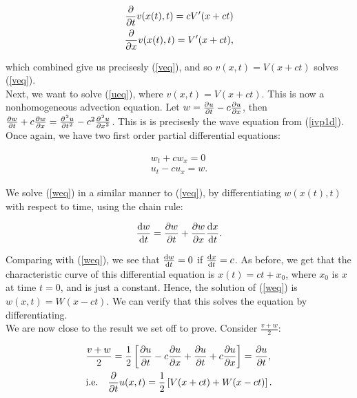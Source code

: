 \documentclass[a4paper, 12pt]{article}
\numberwithin{equation}{section}
\begin{document}
\begin{equation*}
    \begin{aligned}
    \diffp[1]{}{t}v(x(t), t)=cV'(x+ct)\\
    \diffp[1]{}{x}v(x(t), t)=V'(x+ct),
    \end{aligned}
\end{equation*}

which combined give us precisesly (\ref{veq}), and so $v(x,t)=V(x+ct)$ solves (\ref{veq}).
\\

Next, we want to solve (\ref{ueq}), where $v(x,t)=V(x+ct)$. This is now a nonhomogeneous advection equation. Let $w=\diffp[1]{u}{t}-c\diffp{u}{x}$, then 
$\diffp[1]{w}{t}+c\diffp{w}{x}=\diffp[2]{u}{t}-c^2\diffp[2]{u}{x}$. This is is precisesly the wave equation from (\ref{ivp1d}). Once again, we have two first
order partial differential equations:

\begin{align}
    \label{weq}
    w_t+cw_x=0\\
    \label{ueqw}
    u_t-cu_x=w.
\end{align}

We solve (\ref{weq}) in a similar manner to (\ref{veq}), by differentiating $w(x(t),t)$ with respect to time, using the chain rule:

\begin{equation} \label{diffw}
    \diff{w}{t}=\diffp[1]{w}{t}+\diffp[1]{w}{x}\diff{x}{t}. 
\end{equation}

Comparing with (\ref{weq}), we see that $\diff{w}{t}=0$ if $\diff{x}{t}=c$. As before, we get that the characteristic 
curve of this differential equation is $x(t)=ct+x_0$, where $x_0$ is $x$ at time $t=0$, and is just a constant. Hence, the solution of (\ref{weq})
is $w(x,t)=W(x-ct)$. We can verify that this solves the equation by differentiating.
\\

We are now close to the result we set off to prove. Consider $\frac{v+w}{2}$:

\begin{equation*}
    \begin{aligned}
    &\frac{v+w}{2}=\frac{1}{2}\left[\diffp[1]{u}{t}-c\diffp[1]{u}{x}+\diffp[1]{u}{t}+c\diffp[1]{u}{x}\right]=\diffp[1]{u}{t},\\
    &\textrm{i.e.} \quad \diffp[1]{}{t}u(x, t)=\frac{1}{2}\left[V(x+ct)+W(x-ct)\right].
    \end{aligned}
\end{equation*}
\end{document}
